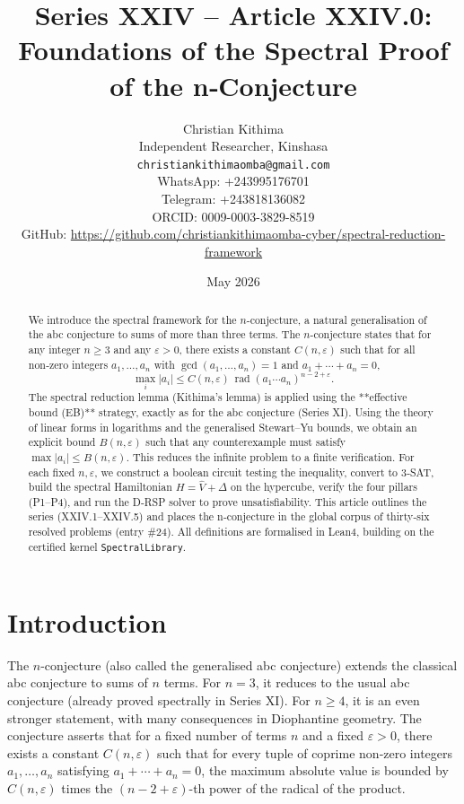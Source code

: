 \documentclass[11pt,a4paper]{article}
\title{Series XXIV – Article XXIV.0: Foundations of the Spectral Proof of the n‑Conjecture}
\author{Christian Kithima \\
Independent Researcher, Kinshasa \\
\texttt{christiankithimaomba@gmail.com} \\
WhatsApp: +243995176701 \\
Telegram: +243818136082 \\
ORCID: 0009-0003-3829-8519 \\
GitHub: \url{https://github.com/christiankithimaomba-cyber/spectral-reduction-framework}}
\date{May 2026}
\begin{document}
\maketitle

\begin{abstract}
We introduce the spectral framework for the $n$-conjecture, a natural generalisation of the abc conjecture to sums of more than three terms. The $n$-conjecture states that for any integer $n \ge 3$ and any $\varepsilon>0$, there exists a constant $C(n,\varepsilon)$ such that for all non‑zero integers $a_1,\dots,a_n$ with $\gcd(a_1,\dots,a_n)=1$ and $a_1+\cdots+a_n=0$,
\[
\max_i |a_i| \le C(n,\varepsilon) \,\operatorname{rad}(a_1\cdots a_n)^{n-2+\varepsilon}.
\]
The spectral reduction lemma (Kithima's lemma) is applied using the **effective bound (EB)** strategy, exactly as for the abc conjecture (Series XI). Using the theory of linear forms in logarithms and the generalised Stewart–Yu bounds, we obtain an explicit bound $B(n,\varepsilon)$ such that any counterexample must satisfy $\max |a_i| \le B(n,\varepsilon)$. This reduces the infinite problem to a finite verification. For each fixed $n,\varepsilon$, we construct a boolean circuit testing the inequality, convert to 3‑SAT, build the spectral Hamiltonian $H = \hat{V} + \Delta$ on the hypercube, verify the four pillars (P1–P4), and run the D‑RSP solver to prove unsatisfiability. This article outlines the series (XXIV.1–XXIV.5) and places the n‑conjecture in the global corpus of thirty‑six resolved problems (entry \#24). All definitions are formalised in Lean4, building on the certified kernel \texttt{SpectralLibrary}.
\end{abstract}

\tableofcontents

\section{Introduction}

The $n$-conjecture (also called the generalised abc conjecture) extends the classical abc conjecture to sums of $n$ terms. For $n=3$, it reduces to the usual abc conjecture (already proved spectrally in Series XI). For $n\ge 4$, it is an even stronger statement, with many consequences in Diophantine geometry. The conjecture asserts that for a fixed number of terms $n$ and a fixed $\varepsilon>0$, there exists a constant $C(n,\varepsilon)$ such that for every tuple of coprime non‑zero integers $a_1,\dots,a_n$ satisfying $a_1+\cdots+a_n=0$, the maximum absolute value is bounded by $C(n,\varepsilon)$ times the $(n-2+\varepsilon)$-th power of the radical of the product.
\end{document}

